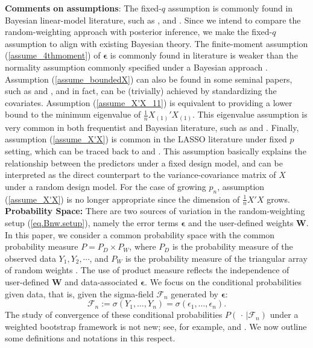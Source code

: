 \documentclass[ejs,authoryear,linksfromyear]{imsart}
\numberwithin{equation}{section}
\theoremstyle{plain}
\begin{document}
\noindent
\textbf{Comments on assumptions}: The fixed-$q$ assumption is commonly found in Bayesian linear-model literature, such as \cite{JohnsonRossell}, and \cite{NarisettyHe2014}. Since we intend to compare the random-weighting approach with posterior inference, we make the fixed-$q$ assumption to align with existing Bayesian theory. The 
finite-moment assumption (\ref{assume_4thmoment}) of $\bm{\epsilon}$ is commonly found in literature \citep[e.g.,][]{Camponovo2015,Das2019}  is  weaker than the normality assumption commonly specified under a Bayesian approach \citep[e.g.,][]{BayesianLasso,JohnsonRossell,NarisettyHe2014}. Assumption (\ref{assume_boundedX}) can also be found in some seminal papers, such as \citet{BinYu} and \citet{Chatterjee&Lahiri}, and in fact, can be (trivially) achieved by standardizing the covariates. Assumption (\ref{assume_X'X_11}) is equivalent to providing a lower bound to the minimum eigenvalue of $\frac{1}{n} X_{(1)}'X_{(1)}$. This eigenvalue assumption is very common in both frequentist and Bayesian literature, such as \cite{BinYu} and \cite{NarisettyHe2014}. Finally, assumption (\ref{assume_X'X}) is  common in the LASSO literature under fixed $p$ setting, which can be traced back to \cite{Knight&Fu} and \cite{BinYu}. This assumption basically explains the relationship between the predictors under a fixed design model, and can be interpreted as the direct counterpart to the variance-covariance matrix of $X$ under a random design model. For the case of growing $p_n$, assumption (\ref{assume_X'X}) is no longer appropriate since the dimension of $\frac{1}{n} X'X$ grows.  \\ 

\noindent
\textbf{Probability Space:} There are two sources of variation in the random-weighting setup (\ref{eq.Bnw.setup}), namely the error terms $\bm{\epsilon}$ and the user-defined weights $\bm{W}$. In this paper, we consider a common probability space with the common probability measure $P = P_D \times P_W$, where $P_D$ is the probability measure of the observed data $Y_1, Y_2, \cdots$, and $P_W$ is the probability measure of the triangular array of random weights \citep{mason1992rank}. The use of product measure reflects the independence of user-defined $\bm{W}$ and data-associated $\bm{\epsilon}$. We focus on the conditional probabilities given data, that is, given the sigma-field $\mathcal{F}_n$ generated by $\bm{\epsilon}$:
$$
\mathcal{F}_n := \sigma(Y_1, \ldots, Y_n) = \sigma(\epsilon_1, \ldots, \epsilon_n). 
$$
The study of convergence of these conditional probabilities $P( \, \cdot \, |\mathcal{F}_n)$ under a weighted bootstrap framework is not new; see, for example, \citet{mason1992rank} 
and \citet{Lyddon2019Biometrika}. We now outline some definitions and notations in this respect.   
\\
\end{document}
